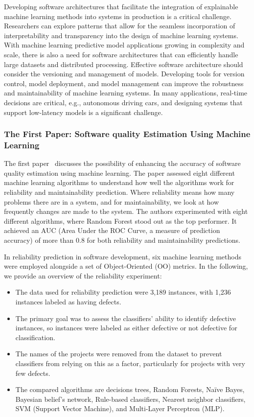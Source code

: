 \documentclass{article}
\begin{document}
Developing software architectures that facilitate the integration of explainable machine learning methods into systems in production is a critical challenge. Researchers can explore patterns that allow for the seamless incorporation of interpretability and transparency into the design of machine learning systems. With machine learning predictive model applications growing in complexity and scale, there is also a need for software architectures that can efficiently handle large datasets and distributed processing. Effective software architecture should consider the versioning and management of models. Developing tools for version control, model deployment, and model management can improve the robustness and maintainability of machine learning systems. In many applications, real-time decisions are critical, e.g., autonomous driving cars, and designing systems that support low-latency models is a significant challenge. 


\subsubsection{The First Paper: Software quality Estimation Using Machine Learning}

The first paper~\cite{8843447} discusses the possibility of enhancing the accuracy of software quality estimation using machine learning. The paper assessed eight different machine learning algorithms to understand how well the algorithms work for reliability and maintainability prediction. Where reliability means how many problems there are in a system, and for maintainability, we look at how frequently changes are made to the system. The authors experimented with eight different algorithms, where Random Forest stood out as the top performer. It achieved an AUC (Area Under the ROC Curve, a measure of prediction accuracy) of more than 0.8 for both reliability and maintainability predictions.

In reliability prediction in software development, six machine learning methods were employed alongside a set of Object-Oriented (OO) metrics. In the following, we provide an overview of the reliability experiment:

\begin{itemize}
    \item The data used for reliability prediction were 3,189 instances, with 1,236 instances labeled as having defects.
    \item The primary goal was to assess the classifiers' ability to identify defective instances, so instances were labeled as either defective or not defective for classification.
    \item The names of the projects were removed from the dataset to prevent classifiers from relying on this as a factor, particularly for projects with very few defects.
    \item The compared algorithms are decisions trees, Random Forests, Naïve Bayes, Bayesian belief's network, Rule-based classifiers, Nearest neighbor classifiers, SVM (Support Vector Machine), and Multi-Layer Perceptron (MLP).
\end{itemize}
\end{document}
